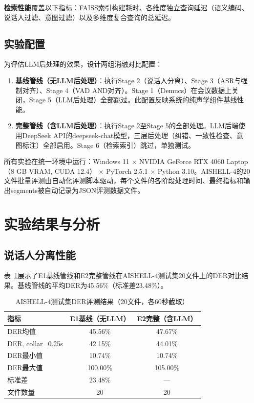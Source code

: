 \documentclass[12pt, a4paper]{article}
\begin{document}
\textbf{检索性能}覆盖以下指标：FAISS索引构建耗时、各维度独立查询延迟（语义编码、说话人过滤、意图过滤）以及多维度复合查询的总延迟。

\subsection{实验配置}

为评估LLM后处理的效果，设计两组消融对比配置：

\begin{enumerate}[label=\textbf{E\arabic*}, leftmargin=*]
    \item \textbf{基线管线（无LLM后处理）}：执行Stage 2（说话人分离）、Stage 3（ASR与强制对齐）、Stage 4（VAD AND对齐）。Stage 1（Demucs）在会议数据上关闭，Stage 5（LLM后处理）全部跳过。此配置反映系统的纯声学组件基线性能。
    \item \textbf{完整管线（含LLM后处理）}：执行Stage 2至Stage 5的全部处理。LLM后端使用DeepSeek API的deepseek-chat模型，三层后处理（纠错、一致性检查、意图标注）全部启用。Stage 6（检索索引）跳过，单独测试。
\end{enumerate}

所有实验在统一环境中运行：Windows 11 × NVIDIA GeForce RTX 4060 Laptop（8 GB VRAM, CUDA 12.4） × PyTorch 2.5.1 × Python 3.10。AISHELL-4的20文件批量评测由自动化评测脚本驱动，每个文件的各阶段处理时间、最终指标和输出segments被自动记录为JSON评测数据文件。

\section{实验结果与分析}

\subsection{说话人分离性能}

表~\ref{tab:der}展示了E1基线管线和E2完整管线在AISHELL-4测试集20文件上的DER对比结果。基线管线的平均DER为45.56\%（标准差23.48\%）。

\begin{table}[H]
\centering
\caption{AISHELL-4测试集DER评测结果（20文件，各60秒截取）}
\label{tab:der}
\begin{tabular}{lcc}
\toprule
\textbf{指标} & \textbf{E1基线（无LLM）} & \textbf{E2完整（含LLM）} \\
\midrule
DER均值 & 45.56\% & 47.67\% \\
DER, collar=0.25s & 42.15\% & 44.01\% \\
DER最小值 & 10.74\% & 10.74\% \\
DER最大值 & 100.00\% & 105.00\% \\
标准差 & 23.48\% & — \\
文件数量 & 20 & 20 \\
\bottomrule
\end{tabular}
\end{table}
\end{document}
